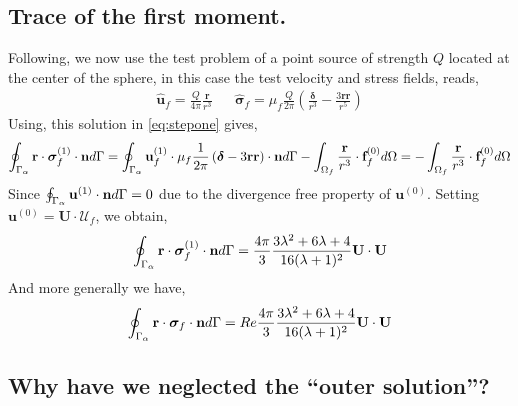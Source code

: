 \subsection{Trace of the first moment.}

Following, \citet{stone2001inertial} we now use the test problem of a point source of strength $Q$ located at the center of the sphere, in this case the test velocity  and stress fields, reads, 
\begin{align*}
    \hat{\textbf{u}}_f = \frac{Q}{4\pi} \frac{\textbf{r}}{r^3}
    && \hat{\bm\sigma}_f = \mu_f \frac{Q}{2\pi}\left(
        \frac{\bm\delta}{r^3}
        - \frac{3 \textbf{rr}}{r^5}
    \right)
\end{align*}
Using, this solution in \ref{eq:stepone} gives, 
\begin{align*}
    \oint_{\Gamma_{\alpha}}  \textbf{r}\cdot  \bm\sigma_f^{(1)} \cdot \textbf{n} d\Gamma
    = 
    \oint_{\Gamma_{\alpha}} \textbf{u}_f^{(1)} \cdot  \mu_f \frac{1}{2\pi}\left(
        \bm\delta
        - 3 \textbf{rr}
    \right) \cdot \textbf{n} d\Gamma
    - \int_{\Omega_f}  \frac{\textbf{r}}{r^3}\cdot  \textbf{f}^{(0)}_f d\Omega
    = 
    - \int_{\Omega_f}  \frac{\textbf{r}}{r^3}\cdot  \textbf{f}^{(0)}_f d\Omega
\end{align*}
Since $\oint_{\Gamma_{\alpha}} \textbf{u}^{(1)} \cdot \textbf{n} d\Gamma =0$ due to the divergence free property of $\textbf{u}^{(0)}$. 
Setting $\textbf{u}^{(0)} = \textbf{U}\cdot \mathcal{U}_f$, we obtain, 
\begin{equation}
    \oint_{\Gamma_{\alpha}}  \textbf{r}\cdot  \bm\sigma_f^{(1)} \cdot \textbf{n} d\Gamma
    = \frac{4\pi}{3} \frac{3\lambda^2 + 6\lambda + 4}{16(\lambda +1 )^2} \textbf{U} \cdot \textbf{U}
\end{equation}
And more generally we have, 
\begin{equation}
    \intS{ \textbf{r}\cdot  \bm\sigma_f \cdot \textbf{n}}
    = Re \frac{4\pi}{3} \frac{3\lambda^2 + 6\lambda + 4}{16(\lambda +1 )^2} \textbf{U} \cdot \textbf{U}
    \label{eq:sol2} 
\end{equation}

\subsection{Why have we neglected the ``outer solution''?}

